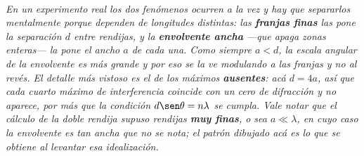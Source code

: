 \begin{center}
\\[0.5em]
{\small\itshape En un experimento real los dos fenómenos ocurren a la vez y hay
que separarlos mentalmente porque dependen de longitudes distintas: las
\textbf{franjas finas} las pone la separación $d$ entre rendijas, y la
\textbf{envolvente ancha} ---que apaga zonas enteras--- la pone el ancho $a$ de
cada una. Como siempre $a < d$, la escala angular de la envolvente es más grande
y por eso se la ve modulando a las franjas y no al revés. El detalle más vistoso
es el de los máximos \textbf{ausentes}: acá $d = 4a$, así que cada cuarto máximo
de interferencia coincide con un cero de difracción y no aparece, por más que la
condición $d\sen\theta = n\lambda$ se cumpla. Vale notar que el cálculo de la
doble rendija supuso rendijas \textbf{muy finas}, o sea $a \ll \lambda$, en cuyo
caso la envolvente es tan ancha que no se nota; el patrón dibujado acá es lo que
se obtiene al levantar esa idealización.}
\end{center}
